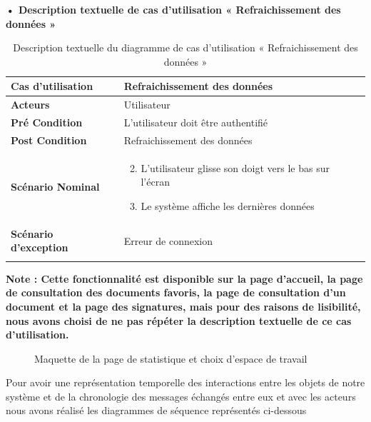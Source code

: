 \textbf{•	Description textuelle de cas d'utilisation « Refraichissement
des données »}



\begin{longtable}{|p{5cm}|p{10cm}|}
\hline
\textbf{Cas d'utilisation}&Refraichissement des données\\
\hline
\textbf{Acteurs}&Utilisateur \\
\hline
\textbf{Pré Condition}&L'utilisateur doit être authentifié\\
\hline
\textbf{Post Condition}&Refraichissement des données\\
\hline
\textbf{Scénario Nominal}&
\vspace{-\baselineskip}
\begin{enumerate}
    \setcounter{enumi}{1}
      \item L'utilisateur glisse son doigt vers le bas sur l'écran
      \item Le système affiche les dernières données
\end{enumerate}\\
\hline
\textbf{Scénario d'exception}&Erreur de connexion\\
\hline
\caption{Description textuelle du diagramme de cas d'utilisation « Refraichissement des données »}
\label{tab:use_case_refraichissement_donnees}
\end{longtable}

\textbf{Note : Cette fonctionnalité est disponible sur la page d'accueil, la page de consultation des documents favoris, la page de consultation d'un document et la page des signatures, mais pour des raisons de lisibilité, nous avons choisi de ne pas répéter la description textuelle de ce cas d'utilisation.}

\begin{figure}[H]
  \centering
  \caption{Maquette de la page de statistique et choix d'espace de travail}
  \label{fig:design_statistique}
\end{figure}


Pour avoir une représentation temporelle des interactions entre les objets de notre système et de la chronologie des messages échangés entre eux et avec les acteurs nous avons réalisé les diagrammes de séquence représentés ci-dessous

